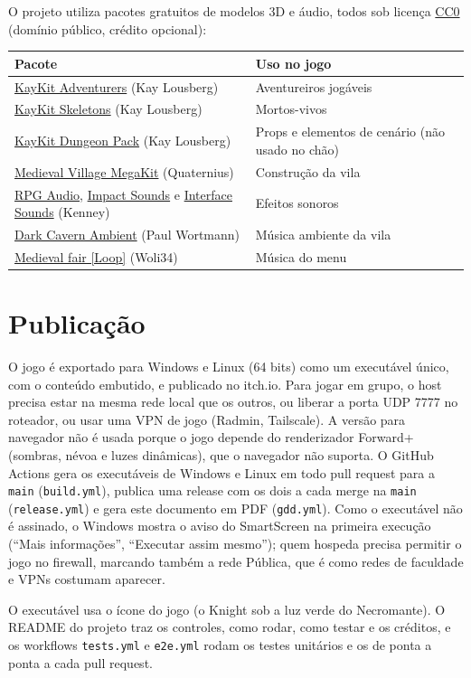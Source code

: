 \documentclass[11pt,a4paper]{article}
\begin{document}
O projeto utiliza pacotes gratuitos de modelos 3D e áudio, todos sob licença \href{https://creativecommons.org/publicdomain/zero/1.0/}{CC0} (domínio público, crédito opcional):

\begin{tabularx}{\textwidth}{@{}lX@{}}
\toprule
\textbf{Pacote} & \textbf{Uso no jogo} \\
\midrule
\href{https://kaylousberg.itch.io/kaykit-adventurers}{KayKit Adventurers} (Kay Lousberg) & Aventureiros jogáveis \\
\href{https://kaylousberg.itch.io/kaykit-skeletons}{KayKit Skeletons} (Kay Lousberg) & Mortos-vivos \\
\href{https://kaylousberg.itch.io/kaykit-dungeon-pack}{KayKit Dungeon Pack} (Kay Lousberg) & Props e elementos de cenário (não usado no chão) \\
\href{https://quaternius.itch.io/medieval-village-megakit}{Medieval Village MegaKit} (Quaternius) & Construção da vila \\
\href{https://kenney.nl/assets/rpg-audio}{RPG Audio}, \href{https://kenney.nl/assets/impact-sounds}{Impact Sounds} e \href{https://kenney.nl/assets/interface-sounds}{Interface Sounds} (Kenney) & Efeitos sonoros \\
\href{https://opengameart.org/content/dark-cavern-ambient}{Dark Cavern Ambient} (Paul Wortmann) & Música ambiente da vila \\
\href{https://opengameart.org/content/medieval-fair-loop}{Medieval fair [Loop]} (Woli34) & Música do menu \\
\bottomrule
\end{tabularx}

\section{Publicação}

O jogo é exportado para Windows e Linux (64 bits) como um executável único, com o conteúdo embutido, e publicado no itch.io. Para jogar em grupo, o host precisa estar na mesma rede local que os outros, ou liberar a porta UDP 7777 no roteador, ou usar uma VPN de jogo (Radmin, Tailscale). A versão para navegador não é usada porque o jogo depende do renderizador Forward+ (sombras, névoa e luzes dinâmicas), que o navegador não suporta. O GitHub Actions gera os executáveis de Windows e Linux em todo pull request para a \texttt{main} (\texttt{build.yml}), publica uma release com os dois a cada merge na \texttt{main} (\texttt{release.yml}) e gera este documento em PDF (\texttt{gdd.yml}). Como o executável não é assinado, o Windows mostra o aviso do SmartScreen na primeira execução (``Mais informações'', ``Executar assim mesmo''); quem hospeda precisa permitir o jogo no firewall, marcando também a rede Pública, que é como redes de faculdade e VPNs costumam aparecer.

O executável usa o ícone do jogo (o Knight sob a luz verde do Necromante). O README do projeto traz os controles, como rodar, como testar e os créditos, e os workflows \texttt{tests.yml} e \texttt{e2e.yml} rodam os testes unitários e os de ponta a ponta a cada pull request.
\end{document}
